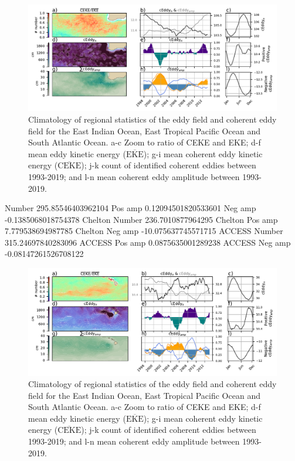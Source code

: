 \documentclass[draft,linenumbers]{agujournal2019}
\newcommand{\MEKE}{\overline{\textrm{EKE}}}
\newcommand{\MCEKE}{\overline{\textrm{CEKE}}}
\begin{document}
	\begin{figure}
	    \centering
	    \includegraphics[width=1\textwidth]{figures/regional_ratios_and_stats_0.pdf}
	    \caption{Climatology of regional statistics of the eddy field and coherent eddy field for the East Indian Ocean, East Tropical Pacific Ocean and South Atlantic Ocean. a-c Zoom to ratio of CEKE and EKE; d-f  mean eddy kinetic energy ($\MEKE$); g-i mean coherent eddy kinetic energy ($\MCEKE$); j-k count of identified coherent eddies between 1993-2019; and l-n mean coherent eddy amplitude between 1993-2019.}
	    \label{fig:east_indian_cycle}
	\end{figure}

	Number 295.85546403962104
	Pos amp 0.12094501820533601
	Neg amp -0.1385068018754378
	Chelton Number 236.7010877964295
	Chelton Pos amp 7.779538694987785
	Chelton Neg amp -10.075637745571715
	ACCESS Number 315.24697840283096
	ACCESS Pos amp 0.0875635001289238
	ACCESS Neg amp -0.08147261526708122

	\begin{figure}
	    \centering
	    \includegraphics[width=1\textwidth]{figures/regional_ratios_and_stats_1.pdf}
	    \caption{Climatology of regional statistics of the eddy field and coherent eddy field for the East Indian Ocean, East Tropical Pacific Ocean and South Atlantic Ocean. a-c Zoom to ratio of CEKE and EKE; d-f  mean eddy kinetic energy ($\MEKE$); g-i mean coherent eddy kinetic energy ($\MCEKE$); j-k count of identified coherent eddies between 1993-2019; and l-n mean coherent eddy amplitude between 1993-2019.}
	    \label{fig:east_tropical_cycle}
	\end{figure}
\end{document}
